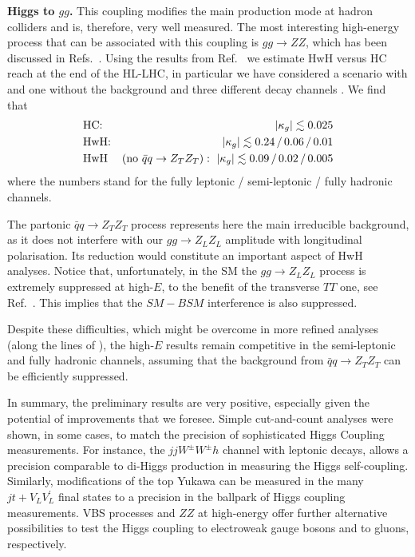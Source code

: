 \vspace{5mm}
\noindent
{\bf Higgs to $gg$.}
This coupling modifies the main production mode at hadron colliders and is, therefore, very well measured. 
The most interesting high-energy process that can be associated with this coupling is $gg\to ZZ$, which has  been discussed in Refs.~\cite{Azatov:2014jga,Cacciapaglia:2014rla,Azatov:2016xik}. 
Using the results from Ref.~\cite{Azatov:2014jga} we estimate HwH versus HC reach at the end of the HL-LHC, in particular we have considered a scenario with and one without the background and three different decay channels . We find that 
\begin{eqnarray}
&\textrm{HC:}\,\,\,\, & |\kappa_g|\lesssim 0.025\nonumber\\
&\textrm{HwH:}&|\kappa_g| \lesssim 0.24\, /\, 0.06 \, /\, 0.01\\
&\textrm{HwH}&(\textrm{no }\bar qq\to Z_TZ_T):\,\, |\kappa_g| \lesssim 0.09  \, /\, 0.02  \, /\, 0.005\nonumber
\end{eqnarray}
where the numbers stand for the fully leptonic / semi-leptonic / fully hadronic channels.

The partonic $\bar qq\to Z_TZ_T$ process represents here the main irreducible background, as it does not interfere with our $gg\to Z_LZ_L$  amplitude with longitudinal polarisation. Its reduction would constitute an important aspect of HwH analyses. Notice that, unfortunately, in the SM  the $gg\to Z_LZ_L$ process is extremely suppressed at high-$E$, to the benefit of the transverse $TT$ one, see Ref.~\cite{Glover:1988rg}.  This implies that the $SM-BSM$ interference is also suppressed.

Despite these difficulties, which might be overcome in more refined analyses (along the lines of \cite{Panico:2017frx,Azatov:2017kzw}), the high-$E$ results remain competitive  in the semi-leptonic and fully hadronic channels, assuming that the background from $\bar qq\to Z_TZ_T$ can be efficiently suppressed. 

\vspace{1cm}

In summary, the preliminary results are very positive,
 especially given the potential of improvements that we foresee.  
Simple cut-and-count analyses were shown, in some cases, to match the precision of sophisticated Higgs Coupling measurements.
For instance, the $jjW^\pm W^\pm h$  channel with leptonic decays, allows a precision comparable to di-Higgs production in measuring the Higgs self-coupling. Similarly, modifications of the top Yukawa can be measured in  the many $j t+ V_LV^\prime_L$ final states to a precision in the ballpark of Higgs coupling measurements.
VBS processes and $ZZ$ at high-energy offer further alternative possibilities to test the Higgs coupling to electroweak gauge bosons and to gluons, respectively.

